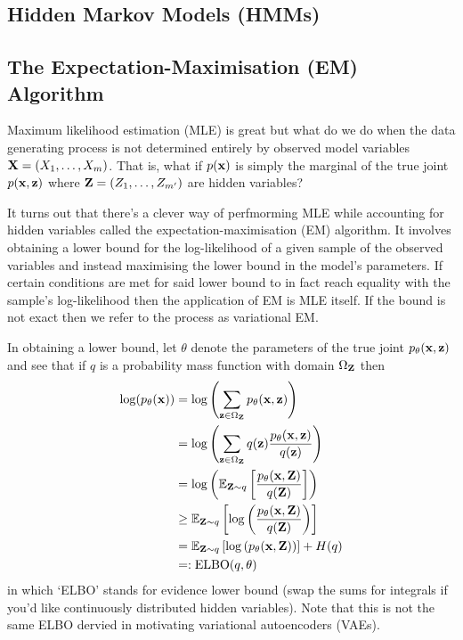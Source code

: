 \documentclass[11pt]{article}
\begin{document}
\begin{appendices}
\subsection{Hidden Markov Models (HMMs)}

\subsection{The Expectation-Maximisation (EM) Algorithm}
Maximum likelihood estimation (MLE) is great but what do we do when the data generating process is not determined entirely by observed model variables $\mathbf{X}=(X_1,\dots,X_m)$. That is, what if $p(\mathbf{x})$ is simply the marginal of the true joint $p(\mathbf{x},\mathbf{z})$ where $\mathbf{Z}=(Z_1,\dots,Z_{m'})$ are hidden variables?

It turns out that there's a clever way of perfmorming MLE while accounting for hidden variables called the expectation-maximisation (EM) algorithm. It involves obtaining a lower bound for the log-likelihood of a given sample of the observed variables and instead maximising the lower bound in the model's parameters. If certain conditions are met for said lower bound to in fact reach equality with the sample's log-likelihood then the application of EM is MLE itself. If the bound is not exact then we refer to the process as variational EM.

In obtaining a lower bound, let $\theta$ denote the parameters of the true joint $p_{\theta}(\mathbf{x},\mathbf{z})$ and see that if $q$ is a probability mass function with domain $\Omega_{\mathbf{Z}}$ then
\begin{align*}
    \log(p_{\theta}(\mathbf{x}))
    &=
    \log\left(\sum_{\mathbf{z}\in\Omega_{\mathbf{Z}}}p_{\theta}(\mathbf{x},\mathbf{z})\right)\\
    &=
    \log\left(\sum_{\mathbf{z}\in\Omega_{\mathbf{Z}}}q(\mathbf{z})\frac{p_{\theta}(\mathbf{x},\mathbf{z})}{q(\mathbf{z})}\right)\\
    &=
    \log\left(\mathbb{E}_{\mathbf{Z}\sim q}\left[\frac{p_{\theta}(\mathbf{x},\mathbf{Z})}{q(\mathbf{Z})}\right]\right)\\
    &\geq
    \mathbb{E}_{\mathbf{Z}\sim q}\left[\log\left(\frac{p_{\theta}(\mathbf{x},\mathbf{Z})}{q(\mathbf{Z})}\right)\right]\\
    &=
    \mathbb{E}_{\mathbf{Z}\sim q}\left[\log\left(p_{\theta}(\mathbf{x},\mathbf{Z})\right)\right]+H(q)\\
    &=:
    \text{ELBO}(q,\theta)
\end{align*}
in which `ELBO' stands for evidence lower bound (swap the sums for integrals if you'd like continuously distributed hidden variables). Note that this is not the same ELBO dervied in motivating variational autoencoders (VAEs).


\end{appendices}
\end{document}
